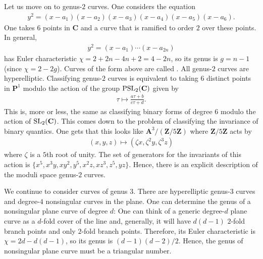 \documentclass [11 pt, oneside] {article}
\begin{document}
Let us move on to genus-$2$ curves. One considers the equation
\begin{align*}
	y^2 = (x-a_1)(x-a_2)(x-a_3)(x-a_4) (x-a_5) (x-a_6).
\end{align*}
One takes $6$ points in $\mathbf{C}$ and a curve that is ramified to order $2$ over these points. In general,
\begin{align*}
	y^2 = (x-a_1)\cdots (x-a_{2n})
\end{align*}
has Euler characteristic $\chi = 2+2n-4n +2 = 4-2n$, so its genus is $g=n-1$ (since $\chi = 2-2g$). Curves of the form above are called . All genus-$2$ curves are hyperelliptic. Classifying genus-$2$ curves is equivalent to taking $6$ distinct points in $\mathbf{P}^1$ modulo the action of the group $\operatorname{PSL}_{2}(\mathbf{C})$ given by
\begin{align*}
	\tau \longmapsto \frac{a\tau+b}{c\tau+d}.
\end{align*}
This is, more or less, the same as classifying binary forms of degree $6$ modulo the action of $\operatorname{SL}_{2}(\mathbf{C})$. This comes down to the problem of classifying the invariance of binary quantics. One gets that this looks like $\mathbf{A}^3/(\mathbf{Z}/5\mathbf{Z})$ where $\mathbf{Z}/5\mathbf{Z}$ acts by
\begin{align*}
	(x,y,z) \longmapsto  (\zeta x,\zeta^2 y, \zeta^3 z)
\end{align*}
where $\zeta$ is a $5$th root of unity. The set of generators for the invariants of this action is $\{x^5,x^3y,xy^2,y^5,x^2z, xz^3, z^5, yz\}$. Hence, there is an explicit description of the moduli space genus-$2$ curves. 

We continue to consider curves of genus $3$. There are hyperelliptic genus-$3$ curves and degree-$4$ nonsingular curves in the plane. One can determine the genus of a nonsingular plane curve of degree $d$: One can think of a generic degree-$d$ plane curve as a $d$-fold cover of the line and, generally, it will have $d(d-1)$ $2$-fold branch points and only $2$-fold branch points. Therefore, its Euler characteristic is $\chi = 2d -  d(d-1)$, so its genus is $(d-1) (d-2)/2$. Hence, the genus of nonsingular plane curve must be a triangular number.
\end{document}
